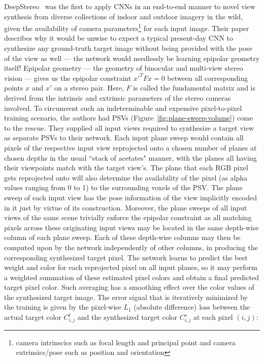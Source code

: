 DeepStereo~\cite{deep_stereo_2016} was the first to apply CNNs in an end-to-end manner to novel view synthesis from diverse collections of indoor and outdoor imagery in the wild, given the availability of camera parameters\footnote{camera intrinscics such as focal length and principal point and camera extrinsics/pose such as position and orientation} for each input image. Their paper describes why it would be unwise to expect a typical present-day CNN to synthesize any ground-truth target image without being provided with the pose of the view as well --- the network would needlessly be learning epipolar geometry itself! Epipolar geometry --- the geometry of binocular and multi-view stereo vision --- gives us the epipolar constraint $x'^T F x = 0$ between all corresponding points $x$ and $x'$ on a stereo pair. Here, $F$ is called the fundamental matrix and is derived from the intrinsic and extrinsic parameters of the stereo cameras involved. To circumvent such an indeterminable and expensive pixel-to-pixel training scenario, the authors had PSVs (Figure~\ref{fig:plane-sweep-volume}) come to the rescue. They supplied all input views required to synthesize a target view as separate PSVs to their network. Each input plane sweep would contain all pixels of the respective input view reprojected onto a chosen number of planes at chosen depths in the usual ``stack of acetates" manner, with the planes all having their viewpoints match with the target view's. The plane that each RGB pixel gets reprojected onto will also determine the availability of the pixel (as alpha values ranging from 0 to 1) to the surrounding voxels of the PSV. The plane sweep of each input view has the pose information of the view implicitly encoded in it just by virtue of its construction. Moreover, the plane sweeps of all input views of the same scene trivially enforce the epipolar constraint as all matching pixels across these originating input views may be located in the same depth-wise column of each plane sweep. Each of these depth-wise columns may then be computed upon by the network independently of other columns, in producing the corresponding synthesized target pixel. The network learns to predict the best weight and color for each reprojected pixel on all input planes, so it may perform a weighted summation of these estimated pixel colors and obtain a final predicted target pixel color. Such averaging has a smoothing effect over the color values of the synthesized target image. The error signal that is iteratively minimized by the training is given by the pixel-wise $L_1$ (absolute difference) loss between the actual target color $C_{i,j}^t$ and the synthesized target color $C_{i,j}^s$ at each pixel $(i,j)$:

